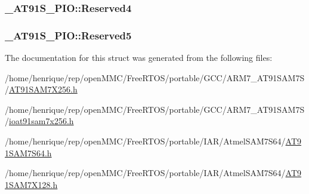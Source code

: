 \hypertarget{struct__AT91S__PIO_a826b47fcd00f5cc0e24e4dd1d945ee62}{
\subsubsection[{Reserved4}]{ \-\_\-\-A\-T91\-S\-\_\-\-P\-I\-O\-::\-Reserved4}}\label{struct__AT91S__PIO_a826b47fcd00f5cc0e24e4dd1d945ee62}
\hypertarget{struct__AT91S__PIO_ac88b41ba83ed5fb1c7f281c88348c604}{
\subsubsection[{Reserved5}]{ \-\_\-\-A\-T91\-S\-\_\-\-P\-I\-O\-::\-Reserved5}}\label{struct__AT91S__PIO_ac88b41ba83ed5fb1c7f281c88348c604}


The documentation for this struct was generated from the following files\-:\begin{DoxyCompactItemize}
\item 
/home/henrique/rep/open\-M\-M\-C/\-Free\-R\-T\-O\-S/portable/\-G\-C\-C/\-A\-R\-M7\-\_\-\-A\-T91\-S\-A\-M7\-S/\hyperlink{GCC_2ARM7__AT91SAM7S_2AT91SAM7X256_8h}{A\-T91\-S\-A\-M7\-X256.\-h}\item 
/home/henrique/rep/open\-M\-M\-C/\-Free\-R\-T\-O\-S/portable/\-G\-C\-C/\-A\-R\-M7\-\_\-\-A\-T91\-S\-A\-M7\-S/\hyperlink{ioat91sam7x256_8h}{ioat91sam7x256.\-h}\item 
/home/henrique/rep/open\-M\-M\-C/\-Free\-R\-T\-O\-S/portable/\-I\-A\-R/\-Atmel\-S\-A\-M7\-S64/\hyperlink{AT91SAM7S64_8h}{A\-T91\-S\-A\-M7\-S64.\-h}\item 
/home/henrique/rep/open\-M\-M\-C/\-Free\-R\-T\-O\-S/portable/\-I\-A\-R/\-Atmel\-S\-A\-M7\-S64/\hyperlink{AT91SAM7X128_8h}{A\-T91\-S\-A\-M7\-X128.\-h}\end{DoxyCompactItemize}
